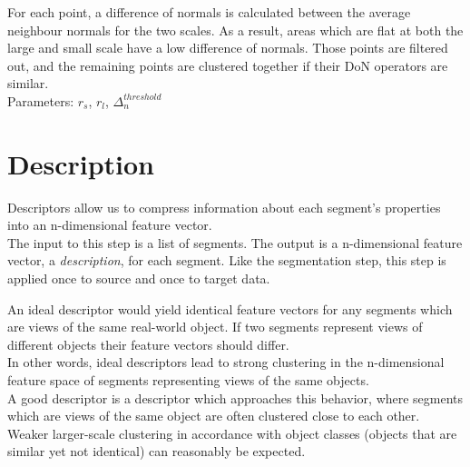 For each point, a difference of normals is calculated between the average neighbour normals for the two scales. As a result, areas which are flat at both the large and small scale have a low difference of normals. Those points are filtered out, and the remaining points are clustered together if their DoN operators are similar.\\

Parameters: $r_s$, $r_l$, $\Delta_n^{threshold}$

% 
% 

% 

\section{Description}
\label{sec:description}

Descriptors allow us to compress information about each segment's properties into an n-dimensional feature vector.\\

The input to this step is a list of segments. The output is a n-dimensional feature vector, a \textit{description}, for each segment. Like the segmentation step, this step is applied once to source and once to target data.

An ideal descriptor would yield identical feature vectors for any segments which are views of the same real-world object. If two segments represent views of different objects their feature vectors should differ.\\

In other words, ideal descriptors lead to strong clustering in the n-dimensional feature space of segments representing views of the same objects. \\

A good descriptor is a descriptor which approaches this behavior, where segments which are views of the same object are often clustered close to each other. Weaker larger-scale clustering in accordance with object classes (objects that are similar yet not identical) can reasonably be expected.\\

